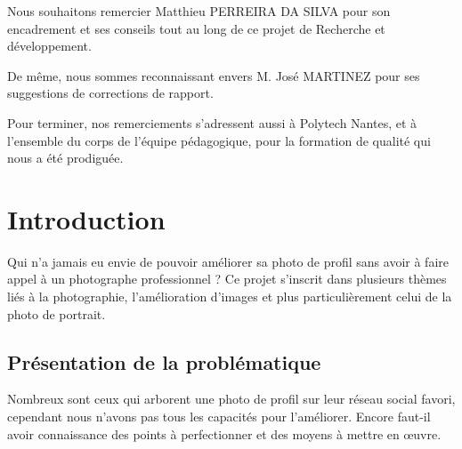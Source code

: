 \documentclass[11pt, french,screen]{report-rd-info}
\begin{document}
\begin{classification}
\end{classification}
\maketitle
\begin{acknowledgements}
Nous souhaitons remercier Matthieu PERREIRA DA SILVA pour son encadrement et ses conseils tout au long de ce projet de Recherche et développement.

De même, nous sommes reconnaissant envers M. José MARTINEZ pour ses suggestions de corrections de rapport.

Pour terminer, nos remerciements s'adressent aussi à Polytech Nantes, et à l'ensemble du corps de l'équipe pédagogique, pour la formation de qualité qui nous a été prodiguée.
\end{acknowledgements}
\newpage
\tableofcontents
\chapter{Introduction}
Qui n'a jamais eu envie de pouvoir améliorer sa photo de profil sans avoir à faire appel à un photographe professionnel ? Ce projet s'inscrit dans plusieurs thèmes liés à la photographie, l'amélioration d'images et plus particulièrement celui de la photo de portrait.
\section{Présentation de la problématique}
Nombreux sont ceux qui arborent une photo de profil sur leur réseau social favori, cependant nous n'avons pas tous les capacités pour l'améliorer. Encore faut-il avoir connaissance des points à perfectionner et des moyens à mettre en œuvre.
\end{document}
